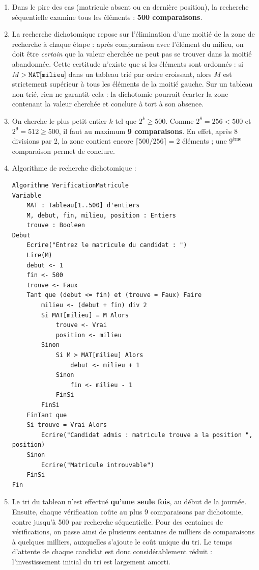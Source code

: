 \documentclass[11pt]{article}
\begin{document}
\begin{corrige}
\begin{enumerate}
\item Dans le pire des cas (matricule absent ou en dernière position), la recherche séquentielle examine tous les éléments : \textbf{500 comparaisons}.

\item La recherche dichotomique repose sur l'élimination d'une moitié de la zone de recherche à chaque étape : après comparaison avec l'élément du milieu, on doit être \emph{certain} que la valeur cherchée ne peut pas se trouver dans la moitié abandonnée. Cette certitude n'existe que si les éléments sont ordonnés : si $M > \texttt{MAT[milieu]}$ dans un tableau trié par ordre croissant, alors $M$ est strictement supérieur à tous les éléments de la moitié gauche. Sur un tableau non trié, rien ne garantit cela : la dichotomie pourrait écarter la zone contenant la valeur cherchée et conclure à tort à son absence.

\item On cherche le plus petit entier $k$ tel que $2^k \geq 500$. Comme $2^8 = 256 < 500$ et $2^9 = 512 \geq 500$, il faut au maximum \textbf{9 comparaisons}. En effet, après 8 divisions par 2, la zone contient encore $\lceil 500/256 \rceil = 2$ éléments ; une $9^{\text{ème}}$ comparaison permet de conclure.

\item Algorithme de recherche dichotomique :

\begin{lstlisting}
Algorithme VerificationMatricule
Variable
    MAT : Tableau[1..500] d'entiers
    M, debut, fin, milieu, position : Entiers
    trouve : Booleen
Debut
    Ecrire("Entrez le matricule du candidat : ")
    Lire(M)
    debut <- 1
    fin <- 500
    trouve <- Faux
    Tant que (debut <= fin) et (trouve = Faux) Faire
        milieu <- (debut + fin) div 2
        Si MAT[milieu] = M Alors
            trouve <- Vrai
            position <- milieu
        Sinon
            Si M > MAT[milieu] Alors
                debut <- milieu + 1
            Sinon
                fin <- milieu - 1
            FinSi
        FinSi
    FinTant que
    Si trouve = Vrai Alors
        Ecrire("Candidat admis : matricule trouve a la position ", position)
    Sinon
        Ecrire("Matricule introuvable")
    FinSi
Fin
\end{lstlisting}

\item Le tri du tableau n'est effectué \textbf{qu'une seule fois}, au début de la journée. Ensuite, chaque vérification coûte au plus 9 comparaisons par dichotomie, contre jusqu'à 500 par recherche séquentielle. Pour des centaines de vérifications, on passe ainsi de plusieurs centaines de milliers de comparaisons à quelques milliers, auxquelles s'ajoute le coût unique du tri. Le temps d'attente de chaque candidat est donc considérablement réduit : l'investissement initial du tri est largement amorti.
\end{enumerate}


\end{corrige}
\end{document}
